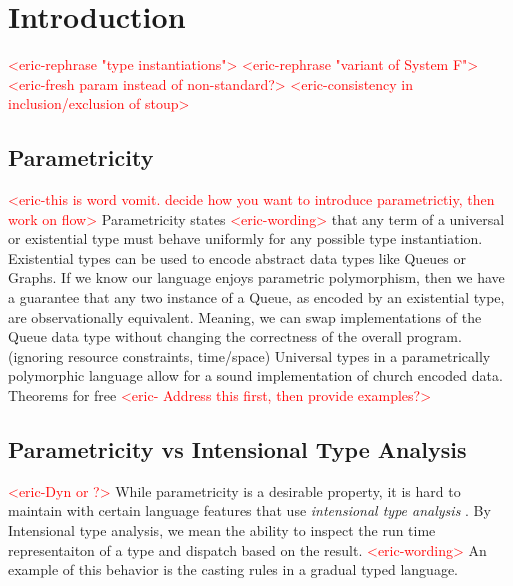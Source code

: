 \documentclass[acmsmall]{acmart}
\newcommand{\eric}[1]{\textcolor{red}{ <eric-#1> }}
\begin{document}




\maketitle

\section{Introduction}
\eric{rephrase "type instantiations"}
\eric{rephrase "variant of System F"}
\eric{fresh param instead of non-standard?}
\eric{consistency in inclusion/exclusion of stoup}
\subsection{Parametricity}
\eric{this is word vomit. decide how you want to introduce parametrictiy, then work on flow}
Parametricity states \eric{wording}that any term of a universal or existential type must behave uniformly for any possible type instantiation.
Existential types can be used to encode abstract data types like Queues or Graphs. 
If we know our language enjoys parametric polymorphism, then we have a guarantee that any two instance of a Queue, as encoded by an existential type, are observationally equivalent.
Meaning, we can swap implementations of the Queue data type without changing the correctness of the overall program. (ignoring resource constraints, time/space)
Universal types in a parametrically polymorphic language allow for a sound implementation of church encoded data. 
Theorems for free
	\eric{
	Address this first, then provide examples?}

\subsection{Parametricity vs Intensional Type Analysis}
\eric{Dyn or ?}
While parametricity is a desirable property, it is hard to maintain with certain language features that use \textit{intensional type analysis} \cite{IntTypeAnalysis}. By Intensional type analysis, we mean the ability to inspect the run time representaiton of a type and dispatch based on the result. \eric{wording}An example of this behavior is the casting rules in a gradual typed language\cite{GradParam}.
\end{document}
